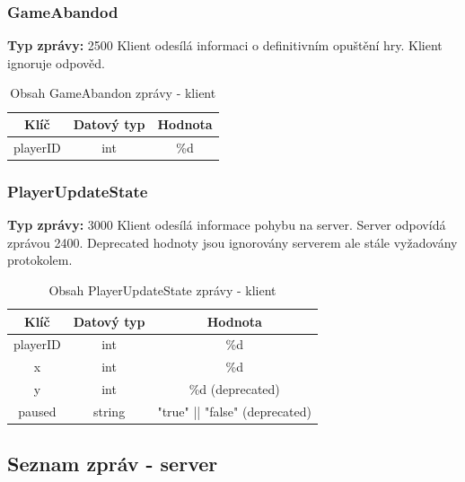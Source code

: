 \documentclass[12pt, a4paper]{article}
\begin{document}
\subsubsection{GameAbandod}
\textbf{Typ zprávy: } 2500 \newline
Klient odesílá informaci o definitivním opuštění hry. Klient ignoruje odpověd. \newline

    \begin{table}[H]
        \centering
        \begin{tabular}{|c|c|c|}
            \hline
            Klíč & Datový typ & Hodnota \\
            \hline
            \hline
            playerID & int & \%d \\
            \hline
        \end{tabular}
        \caption{Obsah GameAbandon zprávy - klient}
    \end{table}

\subsubsection{PlayerUpdateState}
\textbf{Typ zprávy: } 3000 \newline
Klient odesílá informace pohybu na server. Server odpovídá zprávou 2400. Deprecated hodnoty jsou ignorovány serverem
ale stále vyžadovány protokolem. \newline

    \begin{table}[H]
        \centering
        \begin{tabular}{|c|c|c|}
            \hline
            Klíč & Datový typ & Hodnota \\
            \hline
            \hline
            playerID & int & \%d \\
            \hline
            x & int & \%d \\
            \hline
            y & int & \%d (deprecated) \\
            \hline
            paused & string & "true" || "false" (deprecated) \\
            \hline
        \end{tabular}
        \caption{Obsah PlayerUpdateState zprávy - klient}
    \end{table}

\newpage
\subsection{Seznam zpráv - server}
\end{document}
